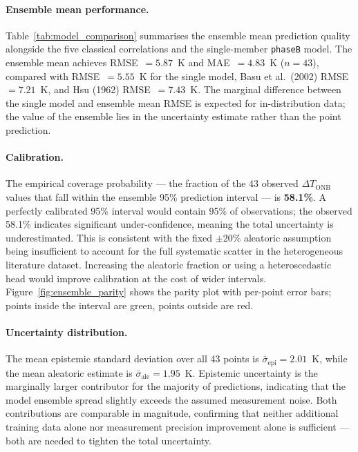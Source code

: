 \paragraph{Ensemble mean performance.}
Table~\ref{tab:model_comparison} summarises the ensemble mean prediction
quality alongside the five classical correlations and the single-member
\texttt{phaseB} model.  The ensemble mean achieves RMSE~$= 5.87$~K and
MAE~$= 4.83$~K ($n = 43$), compared with
RMSE~$= 5.55$~K for the single model, Basu et al.\ (2002)
RMSE~$= 7.21$~K, and Hsu (1962) RMSE~$= 7.43$~K.
The marginal difference between the single model and ensemble mean RMSE is
expected for in-distribution data; the value of the ensemble lies in the
uncertainty estimate rather than the point prediction.

\paragraph{Calibration.}
The empirical coverage probability — the fraction of the 43 observed
$\Delta T_\mathrm{ONB}$ values that fall within the ensemble 95\% prediction
interval — is \textbf{58.1\%}.  A perfectly calibrated 95\% interval
would contain 95\% of observations; the observed 58.1\% indicates significant
under-confidence, meaning the total uncertainty is underestimated.  This is
consistent with the fixed $\pm20$\% aleatoric assumption being insufficient
to account for the full systematic scatter in the heterogeneous literature
dataset.  Increasing the aleatoric fraction or using a heteroscedastic
head would improve calibration at the cost of wider intervals.
Figure~\ref{fig:ensemble_parity} shows the parity plot with per-point error
bars; points inside the interval are green, points outside are red.

\paragraph{Uncertainty distribution.}
The mean epistemic standard deviation over all 43 points is
$\bar{\sigma}_\mathrm{epi} = 2.01$~K, while the mean aleatoric estimate
is $\bar{\sigma}_\mathrm{ale} = 1.95$~K.  Epistemic uncertainty is the
marginally larger contributor for the majority of predictions, indicating
that the model ensemble spread slightly exceeds the assumed measurement
noise.  Both contributions are comparable in magnitude, confirming that
neither additional training data alone nor measurement precision improvement
alone is sufficient — both are needed to tighten the total uncertainty.

